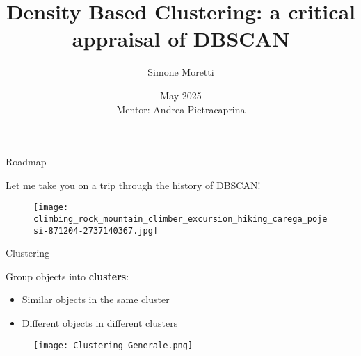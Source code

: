 \documentclass[aspectratio=169]{beamer}
\title{Density Based Clustering: a critical appraisal of DBSCAN}
\subtitle{}
\author[Simone Moretti]{Simone Moretti}
\date{May 2025 \\ {\small Mentor: Andrea Pietracaprina}}
\begin{document}
\frame{\titlepage}

\begin{frame}{Roadmap}

    \centering Let me take you on a trip through the history of DBSCAN!

    \vspace{0.3cm}

    \begin{figure}
        \centering
        \texttt{[image: climbing\_rock\_mountain\_climber\_excursion\_hiking\_carega\_pojesi-871204-2737140367.jpg]}
    \end{figure}

\end{frame}

\begin{comment}
\begin{frame}{Table of Contents}
    \tableofcontents    
\end{frame}
\end{comment}

\begin{frame}{Clustering}

    Group objects into \textbf{clusters}:

    \begin{itemize}
        \item Similar objects in the same cluster
        \item Different objects in different clusters
    \end{itemize}

    

    \vspace{0.3cm}
    
    \begin{figure}
        \centering
        \texttt{[image: Clustering\_Generale.png]}
    \end{figure}

    
\end{frame}
\end{document}
